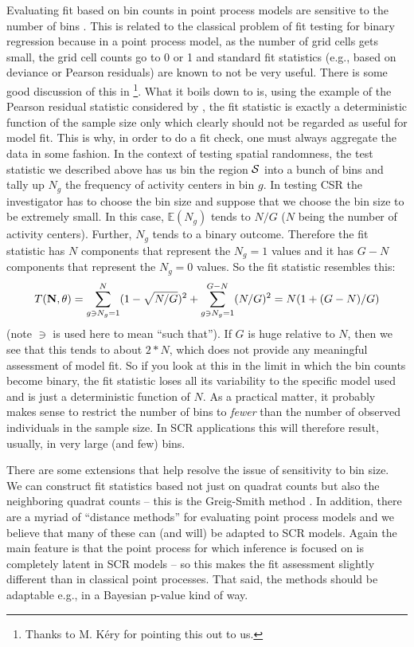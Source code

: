 Evaluating fit based on bin counts in point process models are
sensitive to the number of bins \citep[][p. 87-88]{illian_etal:2008}.
This is related to the classical problem of fit testing for binary
regression because in a point process model, as the number of grid
cells gets small, the grid cell counts go to 0 or 1 and standard fit
statistics (e.g., based on deviance or Pearson residuals) are known to
not be very useful.  There is some good discussion of this in
\citet[][sec. 4.4.5]{mccullagh_nelder:1989}\footnote{Thanks to
  M. K\'{e}ry for pointing this out to us.}.  What it boils down to is, using
the example of the Pearson residual statistic considered by
\citet{mccullagh_nelder:1989}, the fit statistic is exactly a
deterministic function of the sample size only which clearly should
not be regarded as useful for model fit. This is why, in order to do a
fit check, one must always
aggregate the data in some fashion.  In the context of testing spatial
randomness, the test statistic we described above has us bin the
region ${\cal S}$ into a bunch of bins and tally up $N_{g}$ the
frequency of activity centers in bin $g$.  In testing CSR the
investigator has to choose the bin size and suppose that we choose the
bin size to be extremely small.  In this case, $\mathbb{E}(N_{g})$
tends to $N/G$ ($N$ being the number of activity centers).  Further,
$N_{g}$ tends to a binary outcome. Therefore the fit statistic has $N$
components that represent the $N_{g} = 1$ values and it has $G-N$
components that represent the $N_{g} = 0$ values. So the fit statistic
resembles this:
\[
T({\bf N},\theta) = \sum_{g \ni N_{g} = 1}^{N}  (1 - \sqrt{N/G})^2 +
\sum_{g \ni N_{g} = 1}^{G-N} (N/G)^2
 = N(1 + (G-N)/G)
\]
(note $\ni$ is used here to mean ``such that'').  If $G$ is huge
relative to $N$, then we see that this tends to about $2*N$, which
does not provide any meaningful assessment of model fit.  So if you
look at this in the limit in which the bin counts become binary, the
fit statistic loses all its variability to the specific model used and
is just a deterministic function of $N$. As a practical matter, it
probably makes sense to restrict the number of bins to {\it fewer}
than the number of observed individuals in the sample size. In SCR
applications this will therefore result, usually, in very large (and
few) bins.


There are some extensions that help resolve the issue of sensitivity
to bin size. We can construct fit statistics based not just 
on quadrat counts but also the neighboring quadrat counts -- this is
the Greig-Smith method \citep{greig-smith:1964}. 
In addition, there are a myriad of ``distance
methods'' for evaluating point process models and we believe that many
of these can (and will) be adapted to SCR models. Again the main
feature is that the point process for which inference is focused on is
completely latent in SCR models -- so this makes the fit assessment
slightly different than in classical point processes. That said, the
methods should be adaptable e.g., in a Bayesian p-value kind of way.


